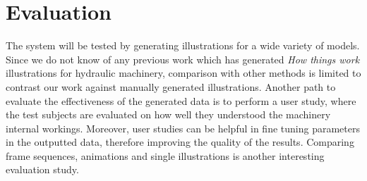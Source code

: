 \chapter{Evaluation}

The system will be tested by generating illustrations for a wide variety of models.
Since we do not know of any previous work which has generated \textit{How things work} illustrations for hydraulic machinery, comparison with other methods is limited to contrast our work against manually generated illustrations.
Another path to evaluate the effectiveness of the generated data is to perform a user study, where the test subjects are evaluated on how well they understood the machinery internal workings.
Moreover, user studies can be helpful in fine tuning parameters in the outputted data, therefore improving the quality of the results.
Comparing frame sequences, animations and single illustrations is another interesting evaluation study.

